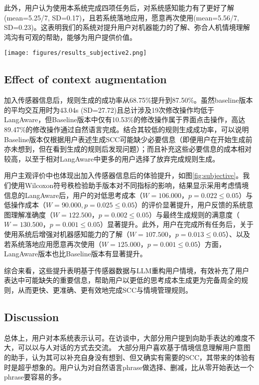     此外，用户认为使用本系统完成四项任务后，对系统感知能力有了更好了解(mean=5.25/7, SD=0.17)，且若系统落地应用，愿意再次使用(mean=5.56/7, SD=0.23)。这表明我们的系统对提升用户对机器能力的了解、弥合人机情境理解鸿沟有可观的帮助，能够为用户提供价值。
    
    \begin{figure*}
        \centering
        \texttt{[image: figures/results\_subjective2.png]}
        \caption{Subjective Ratings of Baseline and LangAware}
        \label{fig:subjective}
    \end{figure*}

\subsection{Effect of context augmentation}
        
    加入传感器信息后，规则生成的成功率从68.75\%提升到87.50\%。虽然baseline版本的平均交互用时为43.04s (SD=27.72)且总计涉及19次修改操作均低于LangAware，但Baseline版本中仅有10.53\%的修改操作属于界面点击操作，高达89.47\%的修改操作通过自然语言完成。结合其较低的规则生成成功率，可以说明Baseline版本仅根据用户表述生成SCC可能缺少必要信息（即便用户在开始生成前亦未想到，但在看到生成的规则后发现问题）；而且补充这些必要信息的成本相对较高，以至于相对LangAware中更多的用户选择了放弃完成规则生成。

    用户主观评价中也体现出加入传感器信息后的体验提升，如图\ref{fig:subjective}。我们使用Wilcoxon符号秩检验助手版本对不同指标的影响，结果显示采用考虑情境信息的LangAware后，用户的对低思考成本（$W = 106.000$，$p = 0.022 \le 0.05$）与低操作成本（$W = 90.000, p=0.025 \le 0.05$）的评价显著提升，用户反馈的系统意图理解准确度（$W = 122.500$，$p = 0.002 \le 0.05$）与最终生成规则的满意度（$W = 130.500$，$p = 0.001 \le 0.05$）显著提升。此外，用户在完成所有任务后，关于使用系统后增强对机器感知能力的了解（$W = 107.500$，$p = 0.013 \le 0.05$）、以及若系统落地应用愿意再次使用（$W = 125.000$，$p = 0.001\le 0.05$）方面，LangAware版本也比Baseline版本有显著提升。

    综合来看，这些提升表明基于传感器数据与LLM重构用户情境，有效补充了用户表达中可能缺失的重要信息，帮助用户以更低的思考成本生成更为完备周全的规则，从而更快、更准确、更有效地完成SCC与情境管理规则。
    
\subsection{Discussion}

总体上，用户对本系统表示认可。在访谈中，大部分用户提到向助手表达的难度不大，可以以与人对话的方式去交流。
大部分用户喜欢基于情境信息理解用户意图的助手，认为其可以补充自身没有想到、但又确实有需要的SCC，其带来的体验有时是超乎想象的。用户认为对自然语言phrase做选择、删减，比从零开始表达一个phrase要容易的多。

